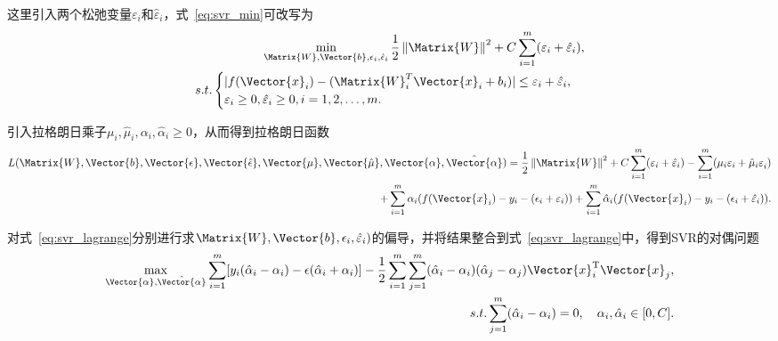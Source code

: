 这里引入两个松弛变量$\varepsilon_i$和$\hat{\varepsilon}_i$，式~\ref{eq:svr_min}可改写为
\begin{equation}
  \label{eq:svr_min_v2}
  \begin{split}
  \min\limits_{\Matrix{W},\Vector{b},\epsilon_i,\hat{\epsilon}_i}\frac{1}{2}\left\|\Matrix{W}\right\|^{2}+C\sum_{i=1}^{m}(\varepsilon_i+\hat{\varepsilon}_i),\\
  s.t. 
  \begin{cases}
  |f(\Vector{x}_i)-(\Matrix{W}_i^{T}\Vector{x}_i+b_i)|\le \varepsilon_i+\hat{\varepsilon}_i,\\
  \varepsilon_i\ge 0, \hat{\varepsilon}_i\ge 0, i=1,2,\ldots,m.
  \end{cases}
  \end{split}
\end{equation}

引入拉格朗日乘子$\mu_i,\hat{\mu}_i,\alpha_i,\hat{\alpha}_i\ge 0$，从而得到拉格朗日函数
\begin{equation}
  \label{eq:svr_lagrange}
  \begin{split}
  L(\Matrix{W},\Vector{b},\Vector{\epsilon},\Vector{\hat{\epsilon}},\Vector{\mu},\Vector{\hat{\mu}},\Vector{\alpha},\hat{\Vector{\alpha}})=\frac{1}{2}\left\|\Matrix{W}\right\|^{2}+C\sum_{i=1}^{m}(\varepsilon_i+\hat{\varepsilon}_i)-\sum_{i=1}^{m}(\mu_{i}\varepsilon_i+{\hat{\mu}_i\varepsilon}_i)\\
  +\sum_{i=1}^{m}\alpha_i(f(\Vector{x}_i)-y_i-(\epsilon_i+\varepsilon_i))+\sum_{i=1}^{m}\hat{\alpha}_i(f(\Vector{x}_i)-y_i-(\epsilon_i+\hat{\varepsilon}_i)).
  \end{split}
\end{equation}

对式~\ref{eq:svr_lagrange}分别进行求$\Matrix{W},\Vector{b},\epsilon_i,\hat{\varepsilon}_i)$的偏导，并将结果整合到式~\ref{eq:svr_lagrange}中，得到SVR的对偶问题
\begin{equation}
  \label{eq:svr_dual}
  \begin{split}
  \max\limits_{\Vector{\alpha},\hat{\Vector{\alpha}}}\sum_{i=1}^{m}[y_i(\hat{\alpha}_i-\alpha_i)-\epsilon(\hat{\alpha}_i+\alpha_i)]-\frac{1}{2}\sum_{i=1}^{m}\sum_{j=1}^{m}(\hat{\alpha}_i-\alpha_i)(\hat{\alpha}_j-\alpha_j)\Vector{x}_i^{\text{T}}\Vector{x}_j,\\
  s.t. 
  \sum_{j=1}^{m}(\hat{\alpha}_i-\alpha_i)=0, \quad \alpha_i, \hat{\alpha}_i\in[0,C].
  \end{split}
\end{equation}

